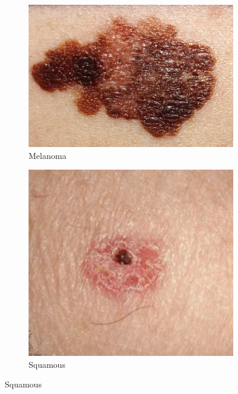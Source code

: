         \begin{figure}[h]
        \centering
            \begin{subfigure}[b]{0.3\textwidth}
                \centering
                \includegraphics[scale=.5]{./chapter-01-general-medical-information/Melanoma.jpg}
                \caption{Melanoma ~\cite{wiki2022}}
                \label{fig:melanoma}
            \end{subfigure}
            \begin{subfigure}[b]{0.3\textwidth}
                \centering
                \includegraphics[scale=.3]{./chapter-01-general-medical-information/Squamous.png}
                \caption{Squamous ~\cite{wd}}
                \label{fig:squamous}
            \end{subfigure}

\end{figure}
